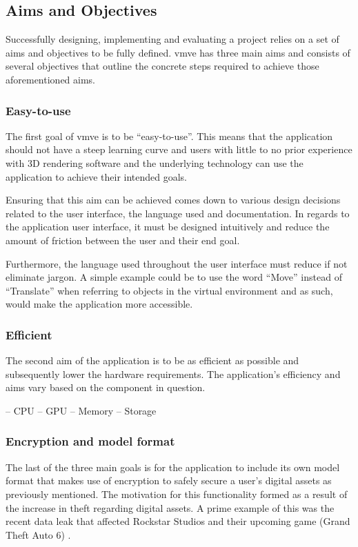 \documentclass[11pt]{article}
\begin{document}
\subsection{Aims and Objectives}
Successfully designing, implementing and evaluating a project relies on a set of
aims and objectives to be fully defined. \gls{vmve} has three main aims and
consists of several objectives that outline the concrete steps required to
achieve those aforementioned aims.

\subsubsection{Easy-to-use}
The first goal of \gls{vmve} is to be ``easy-to-use''. This means that the
application should not have a steep learning curve and users with little to no
prior experience with 3D rendering software and the underlying technology can
use the application to achieve their intended goals.

Ensuring that this aim can be achieved comes down to various design decisions
related to the user interface, the language used and documentation. In regards
to the application user interface, it must be designed intuitively and reduce
the amount of friction between the user and their end goal.

Furthermore, the language used throughout the user interface must reduce if not
eliminate jargon. A simple example could be to use the word ``Move'' instead of
``Translate'' when referring to objects in the virtual environment and as such,
would make the application more accessible.

\subsubsection{Efficient}
The second aim of the application is to be as efficient as possible and
subsequently lower the hardware requirements. The application's efficiency and
aims vary based on the component in question.


-- CPU
-- GPU
-- Memory
-- Storage

\subsubsection{Encryption and model format}
The last of the three main goals is for the application to include its own model
format that makes use of encryption to safely secure a user's digital assets as
previously mentioned. The motivation for this functionality formed as a result
of the increase in theft regarding digital assets. A prime example of this was
the recent data leak that affected Rockstar Studios and their upcoming game
(Grand Theft Auto 6) \cite{gta_leak}.
\end{document}
